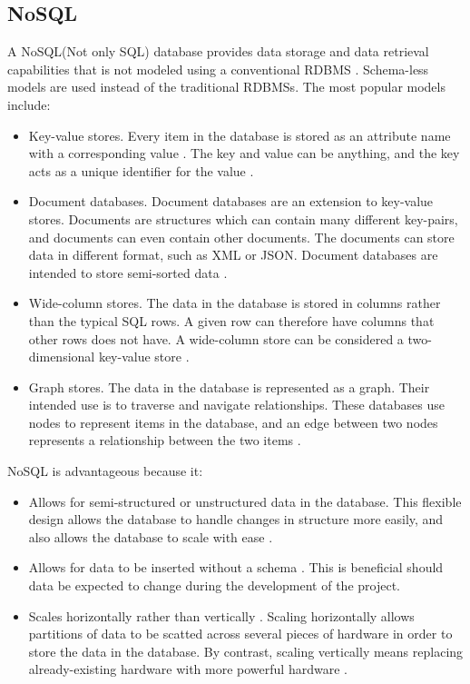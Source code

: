 \subsection{NoSQL}
A NoSQL(Not only SQL) database provides data storage and data retrieval capabilities that is not modeled using a conventional RDBMS \cite{nosql-not-rdbms}.
Schema-less models are used instead of the traditional RDBMSs.
The most popular models include:
\begin{itemize}
    \item Key-value stores.
    Every item in the database is stored as an attribute name with a corresponding value \cite{mongodb-explains-nosql}.
    The key and value can be anything, and the key acts as a unique identifier for the value \cite{nosql-key-value}.
    \item Document databases.
    Document databases are an extension to key-value stores.
    Documents are structures which can contain many different key-pairs, and documents can even contain other documents.
    The documents can store data in different format, such as XML or JSON.
    Document databases are intended to store semi-sorted data \cite{nosql-document-sort}.
    \item Wide-column stores.
    The data in the database is stored in columns rather than the typical SQL rows.
    A given row can therefore have columns that other rows does not have.
    A wide-column store can be considered a two-dimensional key-value store \cite{infoworld-sql-vs-nosql}.
    \item Graph stores.
    The data in the database is represented as a graph.
    Their intended use is to traverse and navigate relationships.
    These databases use nodes to represent items in the database, and an edge between two nodes represents a relationship between the two items \cite{nosql-graph}.
\end{itemize}

NoSQL is advantageous because it:
\begin{itemize}
    \item Allows for semi-structured or unstructured data in the database.
    This flexible design allows the database to handle changes in structure more easily, and also allows the database to scale with ease \cite{mongodb-adv-nosql}.
    \item Allows for data to be inserted without a schema \cite{omkarsoft-adv-nosql}.
    This is beneficial should data be expected to change during the development of the project.
    \item Scales horizontally rather than vertically \cite{mongodb-adv-nosql}.
    Scaling horizontally allows partitions of data to be scatted across several pieces of hardware in order to store the data in the database.
    By contrast, scaling vertically means replacing already-existing hardware with more powerful hardware \cite{technopedia-nosql-scale}.
\end{itemize}

